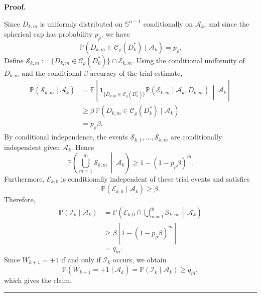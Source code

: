 \documentclass[11pt,a4paper]{article}
\newenvironment{proof}[1][Proof]{%
  \par\noindent\textbf{#1.}\ %
}{%
  \par\vspace{-0.5 ex}            %
  \noindent\hfill\rule{0.5em}{0.5em}\par
  \vspace{1ex}
}
\begin{document}
\begin{proof}
Since \(D_{k,m}\) is uniformly distributed on
\(\mathbb S^{n-1}\) conditionally on \(\mathcal A_k\), and since the spherical
cap has probability \(p_\rho\), we have
\[
    \mathbb P(D_{k,m}\in\mathcal C_\rho(D_k^*)\mid\mathcal A_k)=p_\rho .
\]
Define  $\mathcal S_{k,m}
    :=
    \{D_{k,m}\in\mathcal C_\rho(D_k^*)\}
    \cap
    \mathcal E_{k,m}. $
Using the conditional uniformity of \(D_{k,m}\) and the conditional
\(\beta\)-accuracy of the trial estimate,
\[
\begin{aligned}
    \mathbb P(\mathcal S_{k,m}\mid\mathcal A_k)
    &=
    \mathbb E\!\left[
        \mathbf 1_{\{D_{k,m}\in\mathcal C_\rho(D_k^*)\}}
        \mathbb P(\mathcal E_{k,m}\mid\mathcal A_k,D_{k,m})
        \,\middle|\,
        \mathcal A_k
    \right]                                      \\
    &\ge
    \beta\,
    \mathbb P(D_{k,m}\in\mathcal C_\rho(D_k^*)\mid\mathcal A_k)              \\
    &=
    p_\rho\beta .
\end{aligned}
\]
By conditional independence, the events
\(\mathcal S_{k,1},\ldots,\mathcal S_{k,\bar{m}}\) are conditionally independent
given \(\mathcal A_k\). Hence
\[
    \mathbb P\left(
        \bigcup_{m=1}^{\bar{m}} \mathcal S_{k,m}
        \,\middle|\,
        \mathcal A_k
    \right)
    \ge
    1-(1-p_\rho\beta)^{\bar{m}}.
\]
Furthermore, \(\mathcal E_{k,0}\) is conditionally independent of these trial
events and satisfies
\[
    \mathbb P(\mathcal E_{k,0}\mid\mathcal A_k)\ge\beta.
\]
Therefore,
\[
\begin{aligned}
    \mathbb P(\mathcal I_k\mid\mathcal A_k)
    &=
    \mathbb P\left(
        \mathcal E_{k,0}
        \cap
        \bigcup_{m=1}^{\bar{m}} \mathcal S_{k,m}
        \,\middle|\,
        \mathcal A_k
    \right)                                                               \\
    &\ge
    \beta\left[1-(1-p_\rho\beta)^{\bar{m}}\right]                                  \\
    &=
    q_{\bar{m}}.
\end{aligned}
\]
Since \(W_{k+1}=+1\) if and only if \(\mathcal I_k\) occurs, we obtain
\[
    \mathbb P(W_{k+1}=+1\mid\mathcal A_k)
    =
    \mathbb P(\mathcal I_k\mid\mathcal A_k)
    \ge q_{\bar{m}},
\]
which gives the claim.
\end{proof}
\end{document}
